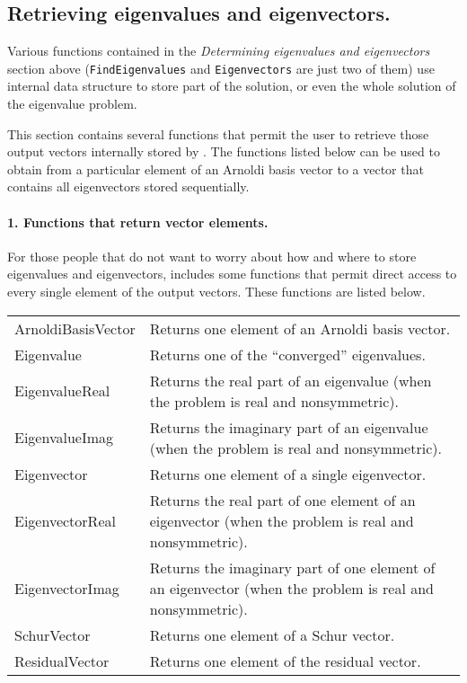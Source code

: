 \subsection{Retrieving eigenvalues and eigenvectors.}

Various functions contained in the \textit{Determining eigenvalues and eigenvectors} section above (\texttt{FindEigenvalues} and \texttt{Eigenvectors} are just two of them) use \ARPP{} internal data structure to store part of the solution, or even the whole solution of the eigenvalue problem.

This section contains several functions that permit the user to retrieve those output vectors internally stored by \ARPP{}. The functions listed below can be used to obtain from a particular element of an Arnoldi basis vector to a vector that contains all eigenvectors stored sequentially.

\paragraph{1. Functions that return vector elements.}

For those people that do not want to worry about how and where to store eigenvalues and eigenvectors, \ARPP{} includes some functions that permit direct access to every single element of the output vectors. These functions are listed below.

\begin{tabularx}{\textwidth}{LX}
	ArnoldiBasisVector & Returns one element of an Arnoldi basis vector.\\
	Eigenvalue & Returns one of the ``converged'' eigenvalues.\\
	EigenvalueReal & Returns the real part of an eigenvalue (when the problem is real and nonsymmetric).\\
	EigenvalueImag & Returns the imaginary part of an eigenvalue (when the problem is real and nonsymmetric).\\
	Eigenvector & Returns one element of a single eigenvector.\\
	EigenvectorReal & Returns the real part of one element of an eigenvector (when the problem is real and nonsymmetric).\\
	EigenvectorImag & Returns the imaginary part of one element of an eigenvector (when the problem is real and nonsymmetric).\\
	SchurVector & Returns one element of a Schur vector.\\
	ResidualVector & Returns one element of the residual vector.\\
\end{tabularx}

